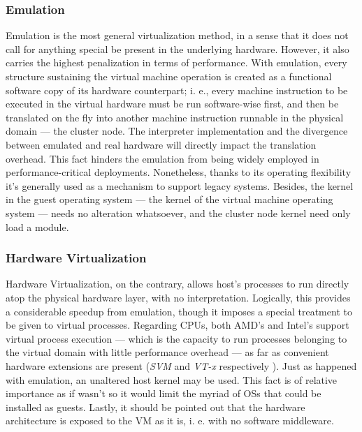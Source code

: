 \subsubsection{Emulation}\label{subsubsec:emulacion}
\noindent Emulation is the most general virtualization method, in a sense that it does not call for anything special be present in the underlying hardware. However, it also carries the highest penalization in terms of performance. With emulation, every structure sustaining the virtual machine operation is created as a functional software copy of its hardware counterpart; i. e., every machine instruction to be executed in the virtual hardware must be run software-wise first, and then be translated on the fly into another machine instruction runnable in the physical domain --- the cluster node. The interpreter implementation and the divergence between emulated and real hardware will directly impact the translation overhead. This fact hinders the emulation from being widely employed in performance-critical deployments. Nonetheless, thanks to its operating flexibility it's generally used as a mechanism to support legacy systems. Besides, the kernel in the guest operating system --- the kernel of the virtual machine operating system --- needs no alteration whatsoever, and the cluster node kernel need only load a module.

\subsubsection{Hardware Virtualization}\label{subsubsec:virthardware}
\noindent Hardware Virtualization, on the contrary, allows host's processes to run directly atop the physical hardware layer, with no interpretation. Logically, this provides a considerable speedup from emulation, though it imposes a special treatment to be given to virtual processes. Regarding CPUs, both AMD's and Intel's support virtual process execution --- which is the capacity to run processes belonging to the virtual domain with little performance overhead --- as far as convenient hardware extensions are present (\emph{SVM} and \emph{VT-x} respectively \cite{intelvtx}). Just as happened with emulation, an unaltered host kernel may be used. This fact is of relative importance as if wasn't so it would limit the myriad of OSs that could be installed as guests. Lastly, it should be pointed out that the hardware architecture is exposed to the VM as it is, i. e. with no software middleware.

